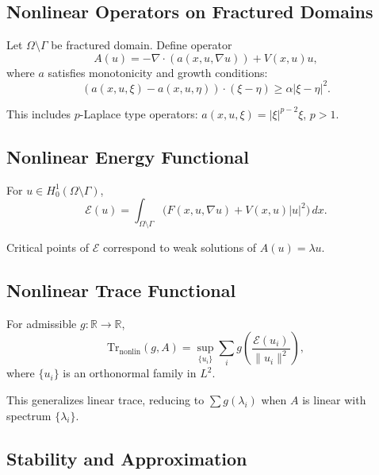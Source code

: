 \subsection{Nonlinear Operators on Fractured Domains}

\begin{definition}
Let $\Omega\setminus\Gamma$ be fractured domain.  
Define operator
\[
A(u) = -\nabla \cdot (a(x,u,\nabla u)) + V(x,u) u,
\]
where $a$ satisfies monotonicity and growth conditions:
\[
(a(x,u,\xi)-a(x,u,\eta))\cdot (\xi-\eta) \geq \alpha |\xi-\eta|^2.
\]
\end{definition}

\begin{remark}
This includes $p$-Laplace type operators: $a(x,u,\xi)=|\xi|^{p-2}\xi$, $p>1$.  
\end{remark}

\subsection{Nonlinear Energy Functional}

\begin{definition}
For $u\in H^1_0(\Omega\setminus \Gamma)$,
\[
\mathcal{E}(u) = \int_{\Omega\setminus \Gamma} \big( F(x,u,\nabla u) + V(x,u)|u|^2 \big)\,dx.
\]
\end{definition}

Critical points of $\mathcal{E}$ correspond to weak solutions of $A(u)=\lambda u$.  

\subsection{Nonlinear Trace Functional}

\begin{definition}
For admissible $g:\mathbb{R}\to \mathbb{R}$,
\[
\mathrm{Tr}_{\mathrm{nonlin}}(g,A) = \sup_{\{u_i\}} \sum_i g\!\left(\frac{\mathcal{E}(u_i)}{\|u_i\|^2}\right),
\]
where $\{u_i\}$ is an orthonormal family in $L^2$.  
\end{definition}

\begin{remark}
This generalizes linear trace, reducing to $\sum g(\lambda_i)$ when $A$ is linear with spectrum $\{\lambda_i\}$.  
\end{remark}

\subsection{Stability and Approximation}

